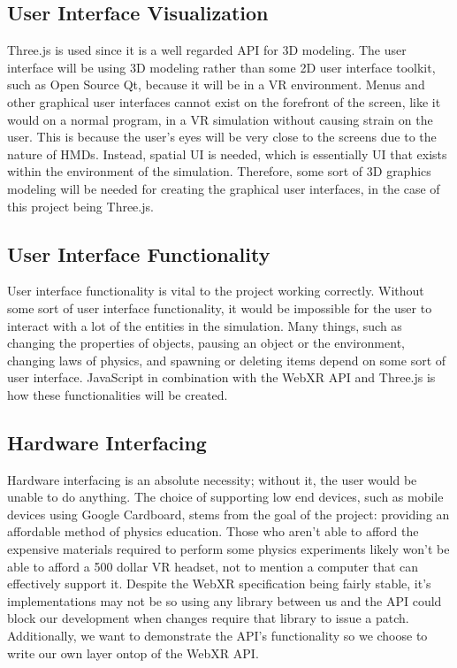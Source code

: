 \documentclass[onecolumn, draftclsnofoot,10pt, compsoc]{IEEEtran}
\begin{document}
\subsection{User Interface Visualization}
Three.js is used since it is a well regarded API for 3D modeling. The user interface will be using 3D modeling rather than some 2D user interface toolkit, such as Open Source Qt, because it will be in a VR environment. Menus and other graphical user interfaces cannot exist on the forefront of the screen, like it would on a normal program, in a VR simulation without causing strain on the user. This is because the user's eyes will be very close to the screens due to the nature of HMDs. Instead, spatial UI is needed, which is essentially UI that exists within the environment of the simulation. Therefore, some sort of 3D graphics modeling will be needed for creating the graphical user interfaces, in the case of this project being Three.js.

\subsection{User Interface Functionality}
User interface functionality is vital to the project working correctly. Without some sort of user interface functionality, it would be impossible for the user to interact with a lot of the entities in the simulation. Many things, such as changing the properties of objects, pausing an object or the environment, changing laws of physics, and spawning or deleting items depend on some sort of user interface. JavaScript in combination with the WebXR API and Three.js is how these functionalities will be created.

\subsection{Hardware Interfacing}
Hardware interfacing is an absolute necessity; without it, the user would be unable to do anything. The choice of supporting low end devices, such as mobile devices using Google Cardboard, stems from the goal of the project: providing an affordable method of physics education. Those who aren't able to afford the expensive materials required to perform some physics experiments likely won't be able to afford a 500 dollar VR headset, not to mention a computer that can effectively support it.  Despite the WebXR specification being fairly stable, it's implementations may not be so using any library between us and the API could block our development when changes require that library to issue a patch.  Additionally, we want to demonstrate the API's functionality so we choose to write our own layer ontop of the WebXR API.
\end{document}
